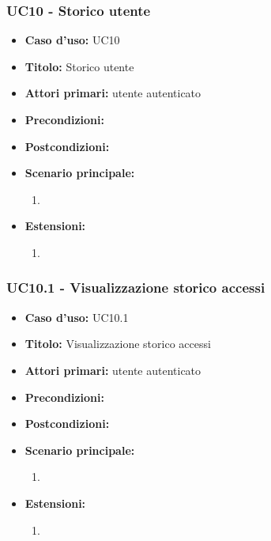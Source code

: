 \documentclass[casi-duso]{subfiles}
\begin{document}
\subsubsection{UC10 - Storico utente}
\label{subsub:uc10utente}
\begin{itemize}
  \item \textbf{Caso d’uso:} UC10
  \item \textbf{Titolo:} Storico utente
  \item \textbf{Attori primari:} utente autenticato
  \item \textbf{Precondizioni:} 
  \item \textbf{Postcondizioni:}
  \item \textbf{Scenario principale:} 
  \begin{enumerate}
    \item 
  \end{enumerate}  
  \item \textbf{Estensioni:} 
  \begin{enumerate}
    \item 
  \end{enumerate}  
\end{itemize}

\subsubsection{UC10.1 - Visualizzazione storico accessi}
\label{subsub:uc10.1utente}
\begin{itemize}
  \item \textbf{Caso d’uso:} UC10.1
  \item \textbf{Titolo:} Visualizzazione storico accessi
  \item \textbf{Attori primari:} utente autenticato
  \item \textbf{Precondizioni:} 
  \item \textbf{Postcondizioni:}
  \item \textbf{Scenario principale:} 
  \begin{enumerate}
    \item 
  \end{enumerate}  
  \item \textbf{Estensioni:} 
  \begin{enumerate}
    \item 
  \end{enumerate}  
\end{itemize}
\end{document}
